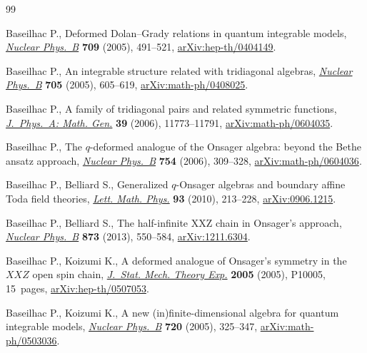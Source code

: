 \documentclass[pdftex]{sigma}
\numberwithin{equation}{section}
\begin{document}
\begin{thebibliography}{99}
\footnotesize\itemsep=0pt

Baseilhac P., Deformed {D}olan--{G}rady relations in quantum integrable models,
 \href{https://doi.org/10.1016/j.nuclphysb.2004.12.016}{\textit{Nuclear Phys.~B}} \textbf{709} (2005), 491--521, \href{https://arxiv.org/abs/hep-th/0404149}{arXiv:hep-th/0404149}.

Baseilhac P., An integrable structure related with tridiagonal algebras,
 \href{https://doi.org/10.1016/j.nuclphysb.2004.11.014}{\textit{Nuclear Phys.~B}} \textbf{705} (2005), 605--619,
 \href{https://arxiv.org/abs/math-ph/0408025}{arXiv:math-ph/0408025}.

Baseilhac P., A family of tridiagonal pairs and related symmetric functions,
 \href{https://doi.org/10.1088/0305-4470/39/38/005}{\textit{J.~Phys.~A: Math. Gen.}} \textbf{39} (2006), 11773--11791,
 \href{https://arxiv.org/abs/math-ph/0604035}{arXiv:math-ph/0604035}.

Baseilhac P., The {$q$}-deformed analogue of the {O}nsager algebra: beyond the
 {B}ethe ansatz approach, \href{https://doi.org/10.1016/j.nuclphysb.2006.08.008}{\textit{Nuclear Phys.~B}} \textbf{754} (2006),
 309--328, \href{https://arxiv.org/abs/math-ph/0604036}{arXiv:math-ph/0604036}.

Baseilhac P., Belliard S., Generalized {$q$}-{O}nsager algebras and boundary
 affine {T}oda field theories, \href{https://doi.org/10.1007/s11005-010-0412-6}{\textit{Lett. Math. Phys.}} \textbf{93} (2010), 213--228, \href{https://arxiv.org/abs/0906.1215}{arXiv:0906.1215}.

Baseilhac P., Belliard S., The half-infinite {XXZ} chain in {O}nsager's
 approach, \href{https://doi.org/10.1016/j.nuclphysb.2013.05.003}{\textit{Nuclear Phys.~B}} \textbf{873} (2013), 550--584, \href{https://arxiv.org/abs/1211.6304}{arXiv:1211.6304}.

Baseilhac P., Koizumi K., A deformed analogue of {O}nsager's symmetry in the
 {$XXZ$} open spin chain, \href{https://doi.org/10.1088/1742-5468/2005/10/p10005}{\textit{J.~Stat. Mech. Theory Exp.}} \textbf{2005}
 (2005), P10005, 15~pages, \href{https://arxiv.org/abs/hep-th/0507053}{arXiv:hep-th/0507053}.

Baseilhac P., Koizumi K., A new (in)finite-dimensional algebra for quantum
 integrable models, \href{https://doi.org/10.1016/j.nuclphysb.2005.05.021}{\textit{Nuclear Phys.~B}} \textbf{720} (2005), 325--347,
 \href{https://arxiv.org/abs/math-ph/0503036}{arXiv:math-ph/0503036}.


\end{thebibliography}
\end{document}
